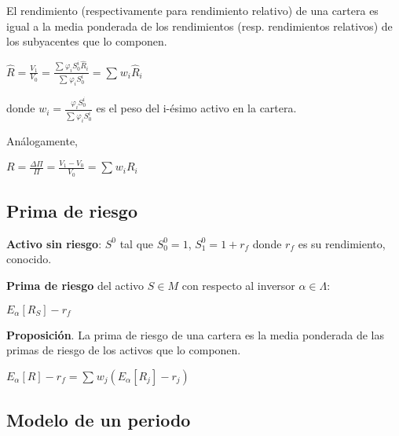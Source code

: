 \documentclass[
10pt, %
a4paper, %
oneside, %
headinclude,footinclude, %
BCOR5mm, %
]{scrartcl}
\newcommand{\n}[1]{\textbf{#1}}
\newcommand{\sub}[1]{_{#1}}
\newcommand{\pot}[1]{^{#1}}
\newcommand{\f}[1]{{\large{${#1}$}}}
\newcommand{\sumatorio}[2]{\sum_{#1}^{#2}}
\newcounter{ex}
\begin{document}

		El rendimiento (respectivamente para rendimiento relativo) de una cartera es igual a la media ponderada de los rendimientos (resp. rendimientos relativos) de los subyacentes que lo componen.

		\begin{center} \f{\hat{R} = \frac{V\sub{1}}{V\sub{0}} = \frac{\sumatorio{}{} \varphi\sub{i}S\sub{0}\pot{i} \hat{R}\sub{i}}{\sumatorio{}{}\varphi\sub{i}S\pot{i}\sub{0}} = \sumatorio{}{} w\sub{i}\hat{R}\sub{i}} \end{center}

		donde \f{w\sub{i} = \frac{\varphi\sub{i}S\sub{0}\pot{i}}{\sumatorio{}{} \varphi\sub{i}S\sub{0}\pot{i}}} es el peso del i-ésimo activo en la cartera. 

		Análogamente, 
		\begin{center} \f{R = \frac{\Delta \Pi}{\Pi} = \frac{V\sub{1} - V\sub{0}}{V\sub{0}} = \sumatorio{}{} w\sub{i} R\sub{i}} \end{center} 

	\subsection{Prima de riesgo}

		\n{Activo sin riesgo}: \f{S\pot{0}} tal que \f{S\sub{0}\pot{0} = 1}, \f{S\sub{1}\pot{0} = 1 + r\sub{f}} donde \f{r\sub{f}} es su rendimiento, conocido.

		\n{Prima de riesgo} del activo \f{S \in M} con respecto al inversor \f{\alpha \in \Lambda}:
		\begin{center} \f{E\sub{\alpha}[R\sub{S}] - r\sub{f}} \end{center}

		\n{Proposición}. La prima de riesgo de una cartera es la media ponderada de las primas de riesgo de los activos que lo componen. 
		\begin{center} \f{E\sub{\alpha}[R] - r\sub{f} = \sumatorio{}{} w\sub{j}(E\sub{\alpha}[R\sub{j}] - r\sub{j})} \end{center}

	\subsection{Modelo de un periodo}
\end{document}
